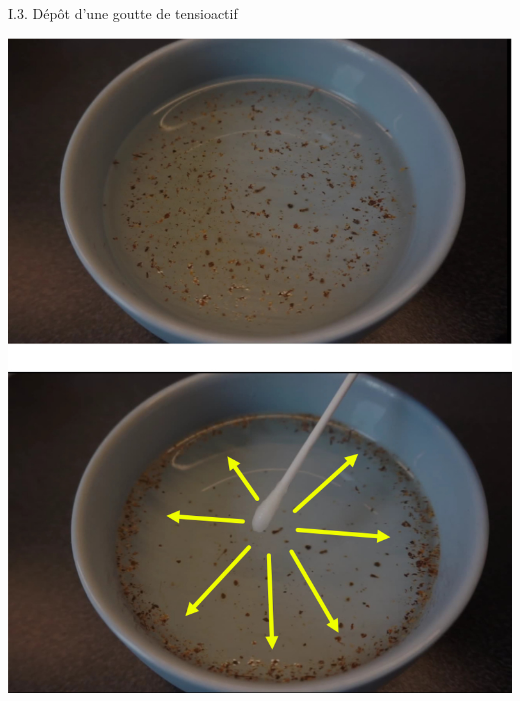 \documentclass[aspectratio=169,10pt]{beamer}
\begin{document}

  \begin{frame}{I.3. Dépôt d'une goutte de tensioactif}
    \begin{minipage}{.4\textwidth}
      \centering
      \resizebox{!}{.8\textwidth}{}
    \end{minipage}\hfill
    \begin{minipage}{.5\textwidth}
      \centering
      \includegraphics[width=.6\textwidth]{./figures/Distanciation_v3.jpg}
    \end{minipage}
  \end{frame}
\end{document}

